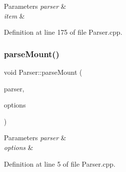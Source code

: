 \begin{DoxyParams}{Parameters}
{\em parser} & \\
\hline
{\em item} & \\
\hline
\end{DoxyParams}


Definition at line 175 of file Parser.\+cpp.

\mbox{\label{namespace_parser_ad8395bb69888f527eefafe64ee3db50e}} 
\subsubsection{\texorpdfstring{parse\+Mount()}{parseMount()}}
{\footnotesize\ttfamily void Parser\+::parse\+Mount (\begin{DoxyParamCaption}\item[{Q\+Command\+Line\+Parser \&}]{parser,  }\item[{Q\+Shared\+Pointer$<$ \hyperlink{struct_gost_crypt_1_1_core_1_1_mount_volume_request}{Gost\+Crypt\+::\+Core\+::\+Mount\+Volume\+Request} $>$}]{options }\end{DoxyParamCaption})}


\begin{DoxyParams}{Parameters}
{\em parser} & \\
\hline
{\em options} & \\
\hline
\end{DoxyParams}


Definition at line 5 of file Parser.\+cpp.

